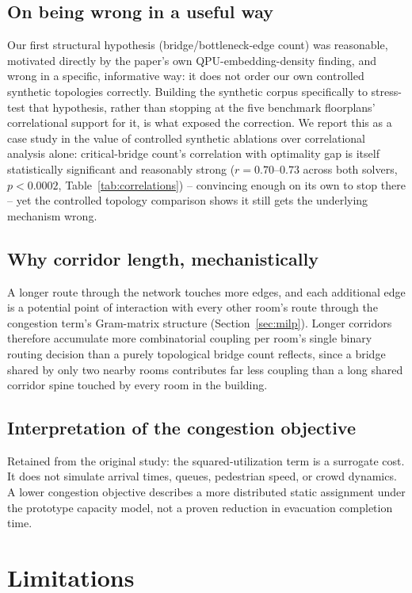 \documentclass[11pt]{article}
\begin{document}
\subsection{On being wrong in a useful way}
Our first structural hypothesis (bridge/bottleneck-edge count) was reasonable, motivated directly by the paper's own QPU-embedding-density finding, and wrong in a specific, informative way: it does not order our own controlled synthetic topologies correctly. Building the synthetic corpus specifically to stress-test that hypothesis, rather than stopping at the five benchmark floorplans' correlational support for it, is what exposed the correction. We report this as a case study in the value of controlled synthetic ablations over correlational analysis alone: critical-bridge count's correlation with optimality gap is itself statistically significant and reasonably strong ($r=0.70$--$0.73$ across both solvers, $p<0.0002$, Table~\ref{tab:correlations}) -- convincing enough on its own to stop there -- yet the controlled topology comparison shows it still gets the underlying mechanism wrong.

\subsection{Why corridor length, mechanistically}
A longer route through the network touches more edges, and each additional edge is a potential point of interaction with every other room's route through the congestion term's Gram-matrix structure (Section~\ref{sec:milp}). Longer corridors therefore accumulate more combinatorial coupling per room's single binary routing decision than a purely topological bridge count reflects, since a bridge shared by only two nearby rooms contributes far less coupling than a long shared corridor spine touched by every room in the building.

\subsection{Interpretation of the congestion objective}
Retained from the original study: the squared-utilization term is a surrogate cost. It does not simulate arrival times, queues, pedestrian speed, or crowd dynamics. A lower congestion objective describes a more distributed static assignment under the prototype capacity model, not a proven reduction in evacuation completion time.

\section{Limitations}
\label{sec:limitations}
\end{document}

